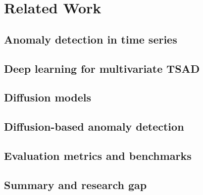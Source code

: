 \chapter{Related Work}
\label{ch:related}

\section{Anomaly detection in time series}

\section{Deep learning for multivariate TSAD}

\section{Diffusion models}

\section{Diffusion-based anomaly detection}

\section{Evaluation metrics and benchmarks}

\section{Summary and research gap}
